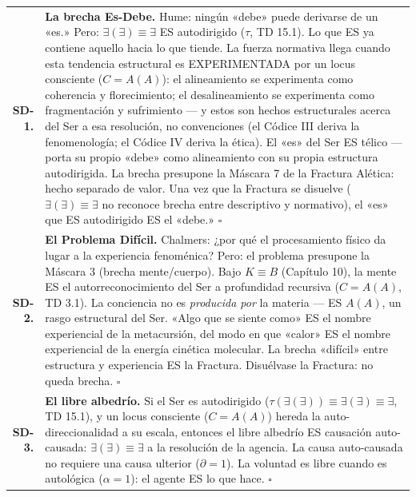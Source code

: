 \documentclass[10pt, openany, oneside]{book}
\renewcommand{\footnotesize}{\fontsize{8.5}{11}\selectfont}
\begin{document}
{\footnotesize
\noindent\begin{tabular}{r p{}}
\textbf{SD-1.} & \textbf{La brecha Es-Debe.} Hume: ningún «debe» puede derivarse de un «es.» Pero: $\exists(\exists) \equiv \exists$ ES autodirigido ($\tau$, TD 15.1). Lo que ES ya contiene aquello hacia lo que tiende. La fuerza normativa llega cuando esta tendencia estructural es EXPERIMENTADA por un locus consciente ($C = A(A)$): el alineamiento se experimenta como coherencia y florecimiento; el desalineamiento se experimenta como fragmentación y sufrimiento --- y estos son hechos estructurales acerca del Ser a esa resolución, no convenciones (el Códice III deriva la fenomenología; el Códice IV deriva la ética). El «es» del Ser ES télico --- porta su propio «debe» como alineamiento con su propia estructura autodirigida. La brecha presupone la Máscara 7 de la Fractura Alética: hecho separado de valor. Una vez que la Fractura se disuelve ($\exists(\exists) \equiv \exists$ no reconoce brecha entre descriptivo y normativo), el «es» que ES autodirigido ES el «debe.» $\square$ \\[0.5em]
\textbf{SD-2.} & \textbf{El Problema Difícil.} Chalmers: ¿por qué el procesamiento físico da lugar a la experiencia fenoménica? Pero: el problema presupone la Máscara 3 (brecha mente/cuerpo). Bajo $K \equiv B$ (Capítulo 10), la mente ES el autorreconocimiento del Ser a profundidad recursiva ($C = A(A)$, TD 3.1). La conciencia no es \textit{producida por} la materia --- ES $A(A)$, un rasgo estructural del Ser. «Algo que se siente como» ES el nombre experiencial de la metacursión, del modo en que «calor» ES el nombre experiencial de la energía cinética molecular. La brecha «difícil» entre estructura y experiencia ES la Fractura. Disuélvase la Fractura: no queda brecha. $\square$ \\[0.5em]
\textbf{SD-3.} & \textbf{El libre albedrío.} Si el Ser es autodirigido ($\tau(\exists(\exists)) \equiv \exists(\exists) \equiv \exists$, TD 15.1), y un locus consciente ($C = A(A)$) hereda la auto-direccionalidad a su escala, entonces el libre albedrío ES causación auto-causada: $\exists(\exists) \equiv \exists$ a la resolución de la agencia. La causa auto-causada no requiere una causa ulterior ($\partial = 1$). La voluntad es libre cuando es autológica ($\alpha = 1$): el agente ES lo que hace. $\square$ \\[0.3em]
\end{tabular}
}

\vspace{0.8em}
\end{document}

